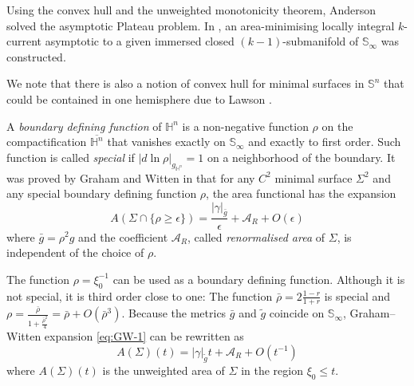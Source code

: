 \documentclass[11pt]{article}
\begin{document}
Using the convex hull and the unweighted monotonicity theorem, Anderson solved the
asymptotic Plateau problem.
In \cite{Anderson82_CompleteMinimalVarieties}, an area-minimising locally
integral \(k\)-current asymptotic to a given immersed closed \((k-1)\)-submanifold of
\(\mathbb{S}_\infty\) was constructed.

We note that there is also a notion of convex hull for  
minimal surfaces in \(\mathbb{S}^n\) that could be contained in one hemisphere due to
Lawson \cite{Lawson70_GlobalBehaviorMinimal}.

A \emph{boundary defining function} of \(\mathbb{H}^n\) is a non-negative function \(\rho\)
on the compactification \(\overline{\mathbb{H}^n}\) that vanishes exactly on \(\mathbb{S}_{\infty}\) and
exactly to first order. 
Such function is called \emph{special} if \(|d\ln\rho|_{g_{\mathbb{H}^n}} = 1\) on a neighborhood
of the boundary. It was proved by Graham and Witten in
\cite{Graham.Witten99_ConformalAnomalySubmanifold} that for any \(C^2\) minimal surface \(\Sigma^2\) and any special 
boundary defining function \(\rho\), the area functional has the expansion
\begin{equation}
\label{eq:GW-1}
 A(\Sigma\cap \{\rho \geq \epsilon\}) = \frac{|\gamma|_{\bar g}}{\epsilon} +
\mathcal{A}_R + O(\epsilon)
\end{equation}
where \(\bar g = \rho^2 g\) and the coefficient \(\mathcal{A}_R\), called \emph{renormalised
area} of \(\Sigma\), is independent of the choice of \(\rho\).

The function \(\rho = \xi_0^{-1}\) can be used as a boundary defining function. Although
it is not special, it is third order close to one:
The function \(\bar\rho = 2 \frac{1-r}{1+r}\) is special and \(\rho =
\frac{\bar\rho}{1 + \frac{\bar\rho^2}{4}}={\bar \rho + O(\bar\rho^3)}\). 
Because the metrics \(\bar g\) and \(\tilde g\) coincide on \(\mathbb{S}_\infty\), Graham--Witten expansion \eqref{eq:GW-1} can be rewritten as
\begin{equation}
\label{eq:Graham-Witten}
 A(\Sigma)(t) = |\gamma|_{\tilde g} t + \mathcal{A}_R + O(t^{-1})
\end{equation}
where \(A(\Sigma)(t)\) is the unweighted area of \(\Sigma\) in the region \(\xi_0\leq
t\).
\end{document}
